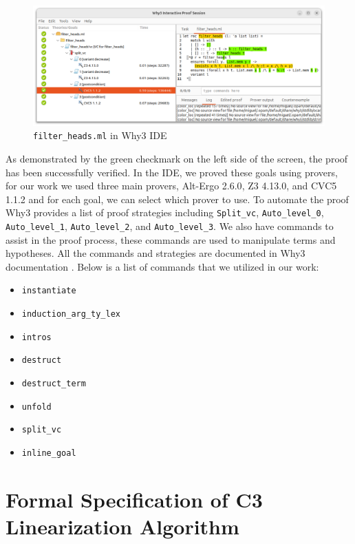 \documentclass[runningheads]{llncs}
\begin{document}
\begin{figure}[htbp]
  \centering
  \includegraphics[width=1\textwidth]{images/Why3FilterHeads.png}
  \caption{\texttt{filter\_heads.ml} in Why3 IDE}
  \label{fig:Why3FilterHeads}
\end{figure}
As demonstrated by the green checkmark on the left side of the screen, the proof has been successfully verified. 
In the IDE, we proved these goals using provers, for our work we used three main provers,
 Alt-Ergo 2.6.0\autocite{sasAltErgoSMTSolver}, Z3 4.13.0\autocite{Z3ProverZ32025}, and CVC5 1.1.2\autocite{Cvc5} and for each goal, we can select which prover to use. To automate the proof Why3 provides a list of proof strategies including \texttt{Split\_vc}, \texttt{Auto\_level\_0}, \texttt{Auto\_level\_1}, 
\texttt{Auto\_level\_2}, and \texttt{Auto\_level\_3}. We also have commands to assist in the proof process, these commands are used to manipulate terms and hypotheses. All the commands and strategies are documented in Why3 documentation \autocite{12TechnicalInformations}.
Below is a list of commands that we utilized in our work:
\begin{itemize}
  \item \texttt{instantiate} 
  \item \texttt{induction\_arg\_ty\_lex}
  \item \texttt{intros} 
  \item \texttt{destruct}
  \item \texttt{destruct\_term}
  \item \texttt{unfold}
  \item \texttt{split\_vc}
  \item \texttt{inline\_goal}
\end{itemize}

\section{Formal Specification of C3 Linearization Algorithm}
\end{document}
